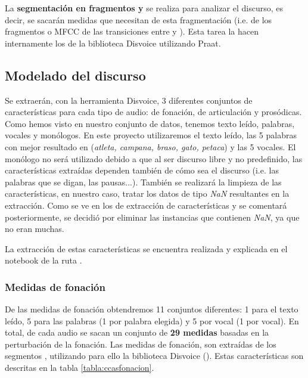 La \textbf{segmentación en fragmentos  y } se realiza para analizar el discurso, es decir, se sacarán medidas que necesitan de esta fragmentación (i.e.  de los fragmentos  o MFCC de las transiciones entre  y ). Esta tarea la hacen internamente los  de la biblioteca Disvoice utilizando Praat.

\subsection{Modelado del discurso} \label{subs:modeldisc}
Se extraerán, con la herramienta Disvoice, 3 diferentes conjuntos de características para cada tipo de audio: de fonación, de articulación y prosódicas. Como hemos visto en nuestro conjunto de datos, tenemos texto leído, palabras, vocales y monólogos. En este proyecto utilizaremos el texto leído, las 5 palabras con mejor resultado en \cite{Orz2016} (\textit{atleta, campana, braso, gato, petaca}) y las 5 vocales. El monólogo no será utilizado debido a que al ser discurso libre y no predefinido, las características extraídas dependen también de cómo sea el discurso (i.e. las palabras que se digan, las pausas...). También se realizará la limpieza de las características, en nuestro caso, tratar los datos de tipo \textit{NaN} resultantes en la extracción. Como se ve en los  de extracción de características y se comentará posteriormente, se decidió por eliminar las instancias que contienen \textit{NaN}, ya que no eran muchas.

La extracción de estas características se encuentra realizada y explicada en el notebook de la ruta .


\subsubsection{Medidas de fonación}
De las medidas de fonación obtendremos 11 conjuntos diferentes: 1 para el texto leído, 5 para las palabras (1 por palabra elegida) y 5 por vocal (1 por vocal). En total, de cada audio se sacan un conjunto de \textbf{29 medidas} basadas en la perturbación de la fonación. Las medidas de fonación, son extraídas de los segmentos , utilizando para ello la biblioteca Disvoice (). Estas características son descritas en la tabla \ref{tabla:ccasfonacion}.

